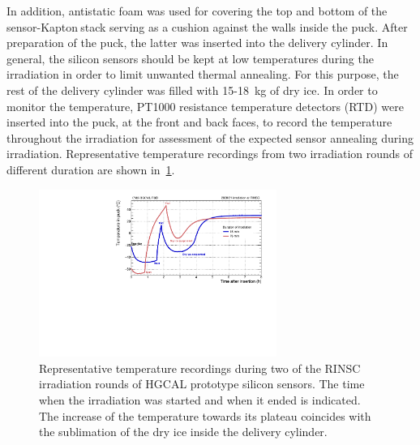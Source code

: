 In addition, antistatic foam was used for covering the top and bottom of the sensor-Kapton\texttrademark$~$stack serving as a cushion  against the walls inside the puck.
After preparation of the puck, the latter was inserted into the delivery cylinder.
In general, the silicon sensors should be kept at low temperatures during the irradiation in order to limit unwanted thermal annealing.
For this purpose, the rest of the delivery cylinder was filled with 15-\SI{18}{\kilo\gram} of dry ice.
In order to monitor the temperature, PT1000 resistance temperature detectors (RTD) were inserted into the puck, at the front and back faces, to record the temperature throughout the irradiation for assessment of the expected sensor annealing during irradiation. 
Representative temperature recordings from two irradiation rounds of different duration are shown in~\ref{fig:Round_10_Temperature_Profile}.
\begin{figure}
  \begin{center}
    \includegraphics[width=0.69\textwidth]{plots/RINSC_temp/RINSC_temp.pdf}
    \caption{Representative temperature recordings during two of the RINSC irradiation rounds of HGCAL prototype silicon sensors. 
    The time when the irradiation was started and when it ended is indicated.
    The increase of the temperature towards its plateau coincides with the sublimation of the dry ice inside the delivery cylinder.
    }
    \label{fig:Round_10_Temperature_Profile}
  \end{center}
\end{figure}
